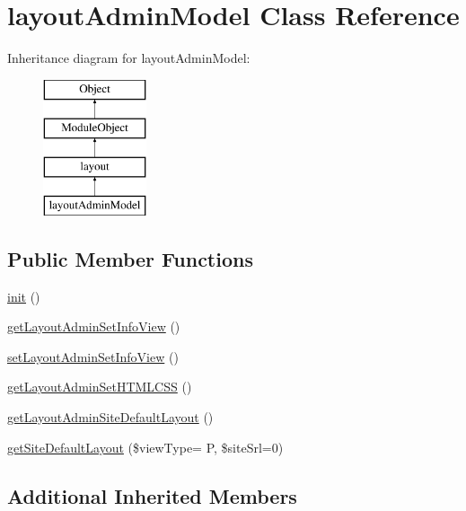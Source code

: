 \hypertarget{classlayoutAdminModel}{}\section{layout\+Admin\+Model Class Reference}
\label{classlayoutAdminModel}
Inheritance diagram for layout\+Admin\+Model\+:\begin{figure}[H]
\begin{center}
\leavevmode
\includegraphics[height=4.000000cm]{classlayoutAdminModel}
\end{center}
\end{figure}
\subsection*{Public Member Functions}
\begin{DoxyCompactItemize}
\item 
\hyperlink{classlayoutAdminModel_aeb0c45993a600a2e3f72bd0a79c3adc7}{init} ()
\item 
\hyperlink{classlayoutAdminModel_a7171578a8c44846e96b6330378152ddd}{get\+Layout\+Admin\+Set\+Info\+View} ()
\item 
\hyperlink{classlayoutAdminModel_a5d53a19d62ff5fcbd2cc604e3d6a8e29}{set\+Layout\+Admin\+Set\+Info\+View} ()
\item 
\hyperlink{classlayoutAdminModel_a5757eaff4093fe8a359b4f3b5a6a2bff}{get\+Layout\+Admin\+Set\+H\+T\+M\+L\+C\+SS} ()
\item 
\hyperlink{classlayoutAdminModel_a1fb703fe8ebe3ced1f904d3a1d645532}{get\+Layout\+Admin\+Site\+Default\+Layout} ()
\item 
\hyperlink{classlayoutAdminModel_af2e53398a6068a4652567b922dfce4b1}{get\+Site\+Default\+Layout} (\$view\+Type= \textquotesingle{}P\textquotesingle{}, \$site\+Srl=0)
\end{DoxyCompactItemize}
\subsection*{Additional Inherited Members}



